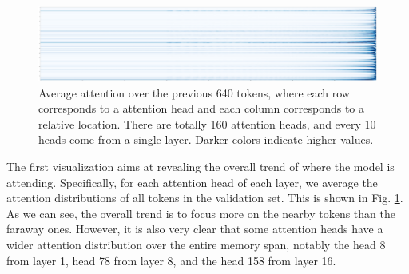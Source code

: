 \begin{figure}[!h]
	\includegraphics[width=\linewidth]{FIG/rel-prob-avg.png}
	\caption{Average attention over the previous 640 tokens, where each row corresponds to a attention head and each column corresponds to a relative location. There are totally 160 attention heads, and every 10 heads come from a single layer. Darker colors indicate higher values.}
	\label{fig:visattn-global}
\end{figure}
The first visualization aims at revealing the overall trend of where the model is attending.
Specifically, for each attention head of each layer, we average the attention distributions of all tokens in the validation set.
This is shown in Fig. \ref{fig:visattn-global}. As we can see, the overall trend is to focus more on the nearby tokens than the faraway ones.
However, it is also very clear that some attention heads have a wider attention distribution over the entire memory span, notably the head 8 from layer 1, head 78 from layer 8, and the head 158 from layer 16.

